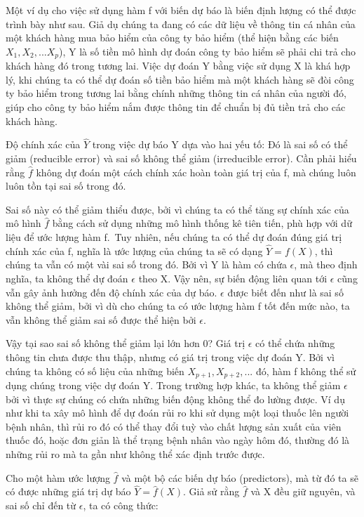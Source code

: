 \documentclass[
]{article}
\begin{document}
Một ví dụ cho việc sử dụng hàm f với biến dự báo là biến định lượng có thể được trình bày như sau. Giả dụ chúng ta đang có các dữ liệu về thông tin cá nhân của một khách hàng mua bảo hiểm của công ty bảo hiểm (thể hiện bằng các biến \(X_1, X_2, ... X_p\)), Y là số tiền mô hình dự đoán công ty bảo hiểm sẽ phải chi trả cho khách hàng đó trong tương lai. Việc dự đoán Y bằng việc sử dụng X là khá hợp lý, khi chúng ta có thể dự đoán số tiền bảo hiểm mà một khách hàng sẽ đòi công ty bảo hiểm trong tương lai bằng chính những thông tin cá nhân của người đó, giúp cho công ty bảo hiểm nắm được thông tin để chuẩn bị đủ tiền trả cho các khách hàng.

Độ chính xác của \(\hat{Y}\) trong việc dự báo Y dựa vào hai yếu tố: Đó là sai số có thể giảm (reducible error) và sai số không thể giảm (irreducible error). Cần phải hiểu rằng \(\hat{f}\) không dự đoán một cách chính xác hoàn toàn giá trị của f, mà chúng luôn luôn tồn tại sai số trong đó.

Sai số này có thể giảm thiểu được, bởi vì chúng ta có thể tăng sự chính xác của mô hình \(\hat{f}\) bằng cách sử dụng những mô hình thống kê tiên tiến, phù hợp với dữ liệu để ước lượng hàm f.~Tuy nhiên, nếu chúng ta có thể dự đoán đúng giá trị chính xác của f, nghĩa là ước lượng của chúng ta sẽ có dạng \(\hat{Y} = f(X)\), thì chúng ta vẫn có một vài sai số trong đó. Bởi vì Y là hàm có chứa \(\epsilon\), mà theo định nghĩa, ta không thể dự đoán \(\epsilon\) theo X. Vậy nên, sự biến động liên quan tới \(\epsilon\) cũng vẫn gây ảnh hưởng đến độ chính xác của dự báo. \(\epsilon\) được biết đến như là sai số không thể giảm, bởi vì dù cho chúng ta có ước lượng hàm f tốt đến mức nào, ta vẫn không thể giảm sai số được thể hiện bởi \(\epsilon\).

Vậy tại sao sai số không thể giảm lại lớn hơn 0? Giá trị \(\epsilon\) có thể chứa những thông tin chưa được thu thập, nhưng có giá trị trong việc dự đoán Y. Bởi vì chúng ta không có số liệu của những biến \(X_{p+1}, X_{p+2},...\) đó, hàm f không thể sử dụng chúng trong việc dự đoán Y. Trong trường hợp khác, ta không thể giảm \(\epsilon\) bởi vì thực sự chúng có chứa những biến động không thể đo lường được. Ví dụ như khi ta xây mô hình để dự đoán rủi ro khi sử dụng một loại thuốc lên người bệnh nhân, thì rủi ro đó có thể thay đổi tuỳ vào chất lượng sản xuất của viên thuốc đó, hoặc đơn giản là thể trạng bệnh nhân vào ngày hôm đó, thường đó là những rủi ro mà ta gần như không thể xác định trước được.

Cho một hàm ước lượng \(\hat{f}\) và một bộ các biến dự báo (predictors), mà từ đó ta sẽ có được những giá trị dự báo \(\hat{Y} = \hat{f}(X)\). Giả sử rằng \(\hat{f}\) và X đều giữ nguyên, và sai số chỉ đến từ \(\epsilon\), ta có công thức:
\end{document}
